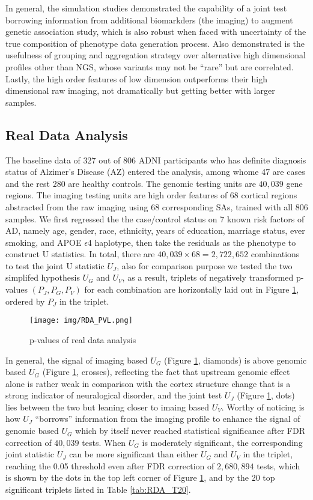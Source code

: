 In general, the simulation studies demonstrated the capability of a joint test borrowing information from additional biomarkders (the imaging) to augment genetic association study, which is also robust when faced with uncertainty of the true composition of phenotype data generation process. Also demonstrated is the usefulness of grouping and aggregation strategy over alternative high dimensional profiles other than NGS, whose variants may not be ``rare'' but are correlated. Lastly, the high order features of low dimension outperforms their high dimensional raw imaging, not dramatically but getting better with larger samples.

\subsection{Real Data Analysis}
The baseline data of 327 out of 806 ADNI participants who has definite diagnosis status of Alzimer's Disease (AZ) entered the analysis, among whome 47 are cases and the rest 280 are healthy controls. The genomic testing units are $40,039$ gene regions. The imaging testing units are high order features of 68 cortical regions abstracted from the raw imaging using 68 corresponding SAs, trained with all 806 samples. We first regressed the the case/control status on 7 known risk factors of AD, namely age, gender, race, ethnicity, years of education, marriage status, ever smoking, and APOE $\epsilon$4 haplotype, then take the residuals as the phenotype to construct U statistics. In total, there are $40,039 \times 68 = 2,722,652$ combinations to test the joint U statistic $U_J$, also for comparison purpose we tested the two simplifed hypothesis $U_G$ and $U_V$, as a result, triplets of negatively transformed p-values $(P_J, P_G, P_V)$ for each combination are horizontally laid out in Figure \ref{fig:RDA_PVL}, ordered by $P_J$ in the triplet.
\begin{figure}[!htbp]
\centering
\texttt{[image: img/RDA\_PVL.png]}
\caption{p-values of real data analysis}
\label{fig:RDA_PVL}
\end{figure}
In general, the signal of imaging based $U_G$ (Figure \ref{fig:RDA_PVL}, diamonds) is above genomic based $U_G$ (Figure \ref{fig:RDA_PVL}, crosses), reflecting the fact that upstream genomic effect alone is rather weak in comparison with the cortex structure change that is a strong indicator of neuralogical disorder, and the joint test $U_J$ (Figure \ref{fig:RDA_PVL}, dots) lies between the two but leaning closer to imaing based $U_V$. Worthy of noticing is how $U_J$ ``borrows'' information from the imaging profile to enhance the signal of genomic based $U_G$ which by itself never reached statistical significance after FDR correction of $40,039$ tests. When $U_G$ is moderately significant, the corresponding joint statistic $U_J$ can be more significant than either $U_G$ and $U_V$ in the triplet, reaching the 0.05 threshold even after FDR correction of $2,680,894$ tests, which is shown by the dots in the top left corner of Figure \ref{fig:RDA_PVL}, and by the 20 top significant triplets listed in Table \ref{tab:RDA_T20}.
